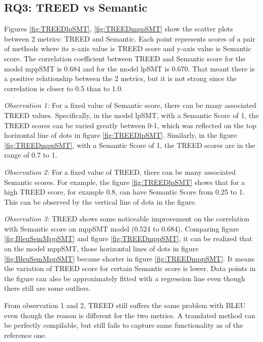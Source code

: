 \subsection{RQ3: TREED vs Semantic}
Figures \ref{fig:TREEDlpSMT}, \ref{fig:TREEDmppSMT}  show the scatter plots between 2 metrics: TREED and Semantic. Each point represents scores of a pair of methods where its x-axis value is TREED score and y-axis value is Semantic score.
The correlation coefficient between TREED and Semantic score for the model mppSMT is 0.684 and for the model lpSMT is 0.670. That meant there is a positive relationship between the 2 metrics, but it is not strong since the correlation is closer to 0.5 than to 1.0.

\emph{Observation 1:} For a fixed value of Semantic score, there can be many associated TREED values. Specifically, in the model lpSMT, with a Semantic Score of 1, the TREED scores can be varied greatly between 0-1, which was reflected on the top horizontal line of dots in figure \ref{fig:TREEDlpSMT}. Similarly, in the figure \ref{fig:TREEDmppSMT}, with a Semantic Score of 1, the TREED scores are in the range of 0.7 to 1. 

\emph{Observation 2:} For a fixed value of TREED, there can be many associated Semantic scores. For example, the figure \ref{fig:TREEDlpSMT} shows that for a high TREED score, for example 0.8, can have Semantic Score from 0.25 to 1. This can be observed by the vertical line of dots in the figure. 

\emph{Observation 3:} TREED shows some noticeable improvement on the correlation with Semantic score on mppSMT model (0.524 to 0.684). Comparing figure \ref{fig:BleuSemMppSMT} and figure \ref{fig:TREEDmppSMT}, it can be realized that on the model mppSMT, those horizontal lines of dots in figure \ref{fig:BleuSemMppSMT} became shorter in figure \ref{fig:TREEDmppSMT}. It means the variation of TREED score for certain Semantic score is lower. Data points in the figure can also be approximately fitted with a regression line even though there still are some outliers. 

From observation 1 and 2, TREED still suffers the same problem with BLEU even though the reason is different for the two metrics. A translated method can be perfectly compilable, but still fails to capture same functionality as of the reference one. 

